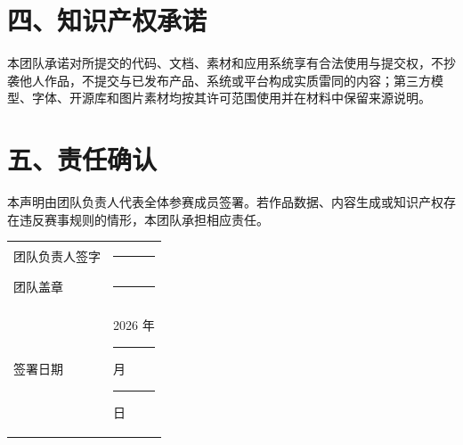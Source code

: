 \documentclass[12pt,a4paper]{article}
\begin{document}
\section*{四、知识产权承诺}
本团队承诺对所提交的代码、文档、素材和应用系统享有合法使用与提交权，不抄袭他人作品，不提交与已发布产品、系统或平台构成实质雷同的内容；第三方模型、字体、开源库和图片素材均按其许可范围使用并在材料中保留来源说明。

\section*{五、责任确认}
本声明由团队负责人代表全体参赛成员签署。若作品数据、内容生成或知识产权存在违反赛事规则的情形，本团队承担相应责任。

\vfill
\noindent\begin{tabularx}{\linewidth}{@{}p{5cm}Y@{}}
团队负责人签字 & \rule{7cm}{0.4pt} \\
团队盖章 & \rule{7cm}{0.4pt} \\
签署日期 & 2026 年 \rule{1cm}{0.4pt} 月 \rule{1cm}{0.4pt} 日 \\
\bottomrule
\end{tabularx}
\end{document}
